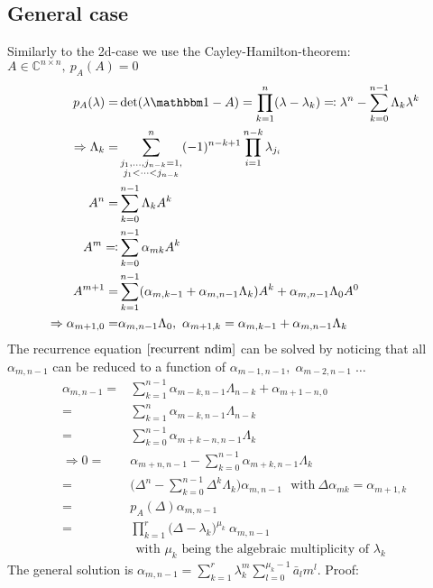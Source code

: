 \documentclass[12pt]{article}
\begin{document}
\subsection{General case}\label{ch:math.general case}
Similarly to the 2d-case we use the Cayley-Hamilton-theorem: $A \in \mathbb C^{n\times n},\ p_A(A) = 0$
\begin{align}
p_A(\lambda) =& \det(\lambda\mathbbm 1 - A) = \prod_{k=1}^n(\lambda - \lambda_k) \eqqcolon \lambda^n - \sum_{k=0}^{n-1} \Lambda_k \lambda^k\nonumber\\
\Rightarrow \Lambda_k =& \sum_{\substack{j_1,\dots,j_{n-k} = 1,\\ j_1<\dots<j_{n-k}}}^n (-1)^{n-k+1} \prod_{i=1}^{n-k} \lambda_{j_i} \\
A^n =& \sum_{k=0}^{n-1} \Lambda_k A^k\nonumber\\
A^m \eqqcolon& \sum_{k=0}^{n-1} \alpha_{mk} A^k\\
A^{m+1} =& \sum_{k=1}^{n-1} (\alpha_{m,k-1} + \alpha_{m,n-1}\Lambda_k) A^k + \alpha_{m,n-1}\Lambda_0 A^0 \nonumber\\
\Rightarrow \alpha_{m+1,0} =& \alpha_{m,n-1} \Lambda_0,\ \alpha_{m+1,k} = \alpha_{m,k-1} + \alpha_{m,n-1}\Lambda_k \label{recurrent ndim}
\end{align}
The recurrence equation $\eqref{recurrent ndim}$ can be solved by noticing that all $\alpha_{m,n-1}$ can be reduced to a function of $\alpha_{m-1,n-1},\; \alpha_{m-2,n-1}\; \dots$
\begin{align}
\alpha_{m,n-1} =& \sum_{k=1}^{n-1} \alpha_{m-k,n-1}\Lambda_{n-k} + \alpha_{m+1-n,0} \nonumber\\
=& \sum_{k=1}^n \alpha_{m-k,n-1}\Lambda_{n-k} \nonumber\\
=& \sum_{k=0}^{n-1} \alpha_{m+k-n,n-1}\Lambda_k \nonumber\\
\Rightarrow 0=& \alpha_{m+n,n-1} - \sum_{k=0}^{n-1} \alpha_{m+k,n-1}\Lambda_k \nonumber\\
=& \big( \Delta^n - \sum_{k=0}^{n-1} \Delta^k \Lambda_k \big) \alpha_{m, n-1} \ \ \ \text{with}\ \Delta \alpha_{mk} = \alpha_{m+1,k}\nonumber\\
=& p_A(\Delta) \alpha_{m, n-1}\nonumber\\
=& \prod_{k=1}^r\big( \Delta - \lambda_k \big)^{\mu_k}\ \alpha_{m, n-1}\\
&\ \ \text{with $\mu_k$ being the algebraic multiplicity of $\lambda_k$}\nonumber
\end{align}
The general solution is $\alpha_{m, n-1} = \sum_{k=1}^r \lambda_k^m \sum_{l=0}^{\mu_k-1} \bar a_l m^l$. Proof:
\end{document}
